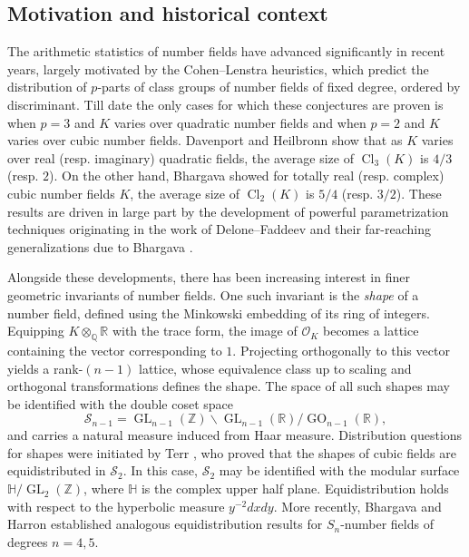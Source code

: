 \documentclass[table]{amsart}
\newcommand{\op}[1]{\operatorname{#1}}
\numberwithin{equation}{section}
\begin{document}
\subsection{Motivation and historical context} The arithmetic statistics of number fields have advanced significantly in recent
years, largely motivated by the Cohen--Lenstra heuristics, which predict the
distribution of $p$-parts of class groups of number fields of fixed degree,
ordered by discriminant. Till date the only cases for which these conjectures are proven is when $p=3$ and $K$ varies over quadratic number fields and when $p=2$ and $K$ varies over cubic number fields. Davenport and Heilbronn \cite{davenportheilbronn} show that as $K$ varies over real (resp. imaginary) quadratic fields, the average size of $\op{Cl}_3(K)$ is $4/3$ (resp. $2$). On the other hand, Bhargava \cite{bhargavequartic} showed for totally real (resp. complex) cubic number fields $K$, the average size of $\op{Cl}_2(K)$ is $5/4$ (resp. $3/2$). These results are driven in large part by the development of powerful parametrization techniques originating in the work of Delone–Faddeev \cite{DeloneFaddev} and their far-reaching generalizations due to Bhargava \cite{bhargavahighercomplaws2}.
\par Alongside these developments, there has been increasing interest in finer
geometric invariants of number fields. One such invariant is the \emph{shape} of
a number field, defined using the Minkowski embedding of its ring of integers.
Equipping $K\otimes_{\mathbb{Q}}\mathbb{R}$ with the trace form, the image of
$\mathcal{O}_K$ becomes a lattice containing the vector corresponding to $1$.
Projecting orthogonally to this vector yields a rank-$(n-1)$ lattice, whose
equivalence class up to scaling and orthogonal transformations defines the
shape. The space of all such shapes may be identified with the double coset
space
\[
\mathcal{S}_{n-1}
=
\operatorname{GL}_{n-1}(\mathbb{Z})
\backslash
\operatorname{GL}_{n-1}(\mathbb{R})
/
\operatorname{GO}_{n-1}(\mathbb{R}),
\]
and carries a natural measure induced from Haar measure. Distribution questions for shapes were initiated by Terr \cite{Terr97}, who proved that the
shapes of cubic fields are equidistributed in $\mathcal{S}_2$. In this case,
$\mathcal{S}_2$ may be identified with the modular surface
$\mathbb{H}/\op{GL}_2(\mathbb{Z})$, where $\mathbb{H}$ is the complex upper half plane. Equidistribution holds
with respect to the hyperbolic measure $y^{-2}dxdy$. More recently, Bhargava and Harron \cite{bhargavaharron}
established analogous equidistribution results for $S_n$-number fields of
degrees $n=4,5$.
\end{document}

